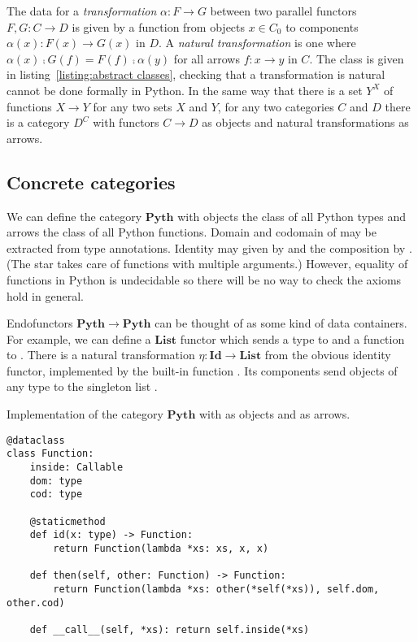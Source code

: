 The data for a \emph{transformation} $\alpha : F \to G$ between two parallel functors $F, G : C \to D$ is given by a function from objects $x \in C_0$ to components $\alpha(x) : F(x) \to G(x)$ in $D$.
A \emph{natural transformation} is one where $\alpha(x) \fcmp G(f) = F(f) \fcmp \alpha(y)$ for all arrows $f : x \to y$ in $C$.
The  class is given in listing~\ref{listing:abstract classes}, checking that a transformation is natural cannot be done formally in Python.
In the same way that there is a set $Y^X$ of functions $X \to Y$ for any two sets $X$ and $Y$, for any two categories $C$ and $D$ there is a category $D^C$ with functors $C \to D$ as objects and natural transformations as arrows.

\subsection{Concrete categories}

\begin{example}\label{ex:python categories}
We can define the category $\mathbf{Pyth}$ with objects the class of all Python types and arrows the class of all Python functions.
Domain and codomain of may be extracted from type annotations.
Identity may given by  and the composition by . (The star takes care of functions with multiple arguments.)
However, equality of functions in Python is undecidable so there will be no way to check the axioms hold in general.

Endofunctors $\mathbf{Pyth} \to \mathbf{Pyth}$ can be thought of as some kind of data containers.
For example, we can define a $\mathbf{List}$ functor which sends a type  to  and a function  to .
There is a natural transformation $\eta : \mathbf{Id} \to \mathbf{List}$ from the obvious identity functor, implemented by the built-in function .
Its components send objects  of any type  to the singleton list .
\end{example}

\begin{python}
{\normalfont Implementation of the category $\mathbf{Pyth}$ with  as objects and  as arrows.}

\begin{verbatim}
@dataclass
class Function:
    inside: Callable
    dom: type
    cod: type

    @staticmethod
    def id(x: type) -> Function:
        return Function(lambda *xs: xs, x, x)

    def then(self, other: Function) -> Function:
        return Function(lambda *xs: other(*self(*xs)), self.dom, other.cod)

    def __call__(self, *xs): return self.inside(*xs)
\end{verbatim}
\end{python}

